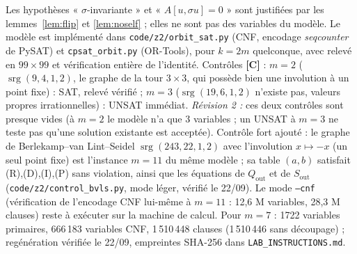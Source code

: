 \documentclass[11pt,a4paper]{article}
\theoremstyle{definition}
\theoremstyle{remark}
\newcommand{\srg}{\operatorname{srg}}
\newcommand{\Sout}{S_{\mathrm{out}}}
\newcommand{\Qout}{Q_{\mathrm{out}}}
\newcommand{\st}[1]{\textbf{[#1]}}
\newcommand{\code}[1]{\texttt{#1}}
\begin{document}
Les hypothèses « $\sigma$-invariante » et « $A[u,\sigma u]=0$ » sont justifiées par les lemmes~\ref{lem:flip} et \ref{lem:noself} ; elles ne sont pas des variables du modèle.
Le modèle est implémenté dans \code{code/z2/orbit\_sat.py} (CNF, encodage \emph{seqcounter} de PySAT) et \code{cpsat\_orbit.py} (OR-Tools), pour $k=2m$ quelconque, avec relevé en $99\times99$ et vérification entière de l'identité.
Contrôles \st{C} : $m=2$ ($\srg(9,4,1,2)$, le graphe de la tour $3\times3$, qui possède bien une involution à un point fixe) : SAT, relevé vérifié ; $m=3$ ($\srg(19,6,1,2)$ n'existe pas, valeurs propres irrationnelles) : UNSAT immédiat.
\emph{Révision 2 :} ces deux contrôles sont presque vides (à $m=2$ le modèle n'a que 3 variables ; un UNSAT à $m=3$ ne teste pas qu'une solution existante est acceptée).
Contrôle fort ajouté : le graphe de Berlekamp--van Lint--Seidel $\srg(243,22,1,2)$ avec l'involution $x\mapsto-x$ (un seul point fixe) est l'instance $m=11$ du même modèle ;
sa table $(a,b)$ satisfait (R),(D),(I),(P) sans violation, ainsi que les équations de $\Qout$ et de $\Sout$ (\code{code/z2/control\_bvls.py}, mode léger, vérifié le 22/09).
Le mode \code{--cnf} (vérification de l'encodage CNF lui-même à $m=11$ : 12,6 M variables, 28,3 M clauses) reste à exécuter sur la machine de calcul.
Pour $m=7$ : 1722 variables primaires, 666\,183 variables CNF, 1\,510\,448 clauses (1\,510\,446 sans découpage) ; regénération vérifiée le 22/09, empreintes SHA-256 dans \code{LAB\_INSTRUCTIONS.md}.
\end{document}
